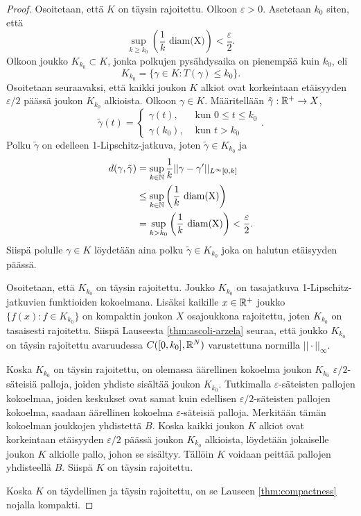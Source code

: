 \documentclass[12pt,oneside,a4paper]{amsbook} %
\begin{document}
\begin{proof}
    Osoitetaan, että $K$ on täysin rajoitettu. Olkoon $\varepsilon > 0$. Asetetaan $k_0$ siten, että 
    \begin{equation*}
        \sup_{k\ge k_0} \left(\frac{1}{k}\text{ diam(X)}\right) < \frac{\varepsilon}{2}.
    \end{equation*}
    Olkoon joukko $K_{k_0} \subset K$, jonka polkujen pysähdysaika on pienempää kuin $k_0$, eli
    \begin{equation*}
        K_{k_0} = \{\gamma \in K : T(\gamma) \le k_0\}.
    \end{equation*}
    Osoitetaan seuraavaksi, että kaikki joukon $K$ alkiot ovat korkeintaan etäisyyden $\varepsilon/2$ päässä joukon $K_{k_0}$ alkioista.
        Olkoon $\gamma \in K$. Määritellään $\tilde \gamma : {\mathbb{R}^{+}} \to X$,
    \begin{equation*}
        \tilde\gamma(t) = \begin{cases}
            \gamma(t), &\text{ kun } 0 \le t \le k_0 \\
            \gamma(k_0), &\text{ kun } t > k_0
        \end{cases}.
    \end{equation*}
    Polku $\tilde\gamma$ on edelleen 1-Lipschitz-jatkuva, joten $\tilde\gamma \in K_{k_0}$ ja 
    \begin{align*}
        d(\gamma, \tilde\gamma) &= \sup_{k \in \mathbb{N}} \frac{1}{k}||\gamma - \gamma'||_{L^\infty[0, k]} \\
        &\le \sup_{k \in \mathbb{N}} \left(\frac{1}{k}\text{ diam(X)}\right)\\
        &= \sup_{k > k_0} \left(\frac{1}{k}\text{ diam(X)}\right) < \frac{\varepsilon}{2}.
    \end{align*}
    Siispä polulle $\gamma \in K$ löydetään aina polku $\tilde\gamma \in K_{k_0}$ joka on halutun etäisyyden päässä.
    
    Osoitetaan, että $K_{k_0}$ on täysin rajoitettu. Joukko $K_{k_0}$ on tasajatkuva 1-Lipschitz-jatkuvien funktioiden kokoelmana. Lisäksi kaikille $x\in {\mathbb{R}^{+}}$ joukko $\{f(x) : f \in K_{k_0}\}$ on kompaktin joukon $X$ osajoukkona rajoitettu, joten $K_{k_0}$ on tasaisesti rajoitettu. Siispä Lauseesta \ref{thm:ascoli-arzela} seuraa, että joukko $K_{k_0}$ on täysin rajoitettu avaruudessa $C([0, k_0], \mathbb{R}^N)$ varustettuna normilla $||\cdot ||_\infty$.
    
    Koska $K_{k_0}$ on täysin rajoitettu, on olemassa äärellinen kokoelma joukon $K_{k_0}$ $\varepsilon/2$-säteisiä palloja, joiden yhdiste sisältää joukon $K_{k_0}$. Tutkimalla $\varepsilon$-säteisten pallojen kokoelmaa, joiden keskukset ovat samat kuin edellisen $\varepsilon/2$-säteisten pallojen kokoelma, saadaan äärellinen kokoelma $\varepsilon$-säteisiä palloja. Merkitään tämän kokoelman joukkojen yhdistettä $B$. Koska kaikki joukon $K$ alkiot ovat korkeintaan etäisyyden $\varepsilon/2$ päässä joukon $K_{k_0}$ alkioista, löydetään jokaiselle joukon $K$ alkiolle pallo, johon se sisältyy. Tällöin $K$ voidaan peittää pallojen yhdisteellä $B$. Siispä $K$ on täysin rajoitettu.
    
    Koska $K$ on täydellinen ja täysin rajoitettu, on se Lauseen \ref{thm:compactness} nojalla kompakti.
    \end{proof}
\end{document}
